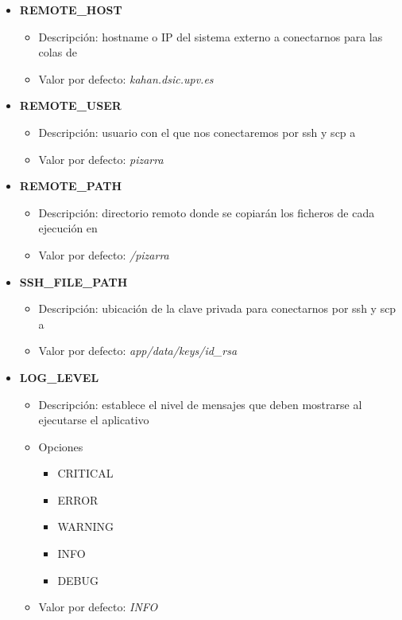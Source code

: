 \documentclass[11pt,spanish,listoffigures,listoftables]{tfgetsinf}
\begin{document}
\begin{itemize}
	\item \textbf{REMOTE\_HOST}
	\begin{itemize}
		\item Descripción: hostname o IP del sistema externo a conectarnos para las colas de \kahan
		\item Valor por defecto: \textit{kahan.dsic.upv.es}
	\end{itemize}
\end{itemize}

\begin{itemize}
	\item \textbf{REMOTE\_USER}
	\begin{itemize}
		\item Descripción: usuario con el que nos conectaremos por \acrshort{ssh} y \acrshort{scp} a \kahan
		\item Valor por defecto: \textit{pizarra}
	\end{itemize}
\end{itemize}

\begin{itemize}
	\item \textbf{REMOTE\_PATH}
	\begin{itemize}
		\item Descripción: directorio remoto donde se copiarán los ficheros de cada ejecución en \kahan
		\item Valor por defecto: \textit{/pizarra}
	\end{itemize}
\end{itemize}

\begin{itemize}
	\item \textbf{SSH\_FILE\_PATH}
	\begin{itemize}
		\item Descripción: ubicación de la clave privada para conectarnos por \acrshort{ssh} y \acrshort{scp} a \kahan
		\item Valor por defecto: \textit{app/data/keys/id\_rsa}
	\end{itemize}
\end{itemize}


\begin{itemize}
	\item \textbf{LOG\_LEVEL}
	\begin{itemize}
		\item Descripción: establece el nivel de mensajes que deben mostrarse al ejecutarse el aplicativo
		\item Opciones
		\begin{itemize}
			\item CRITICAL
			\item ERROR
			\item WARNING
			\item INFO
			\item DEBUG
		\end{itemize}
		\item Valor por defecto: \textit{INFO}
	\end{itemize}
\end{itemize}
\end{document}
